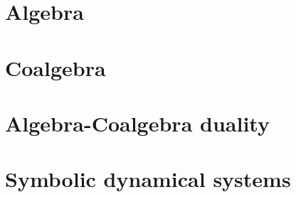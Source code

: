 

%










	\begin{frame}
		\titlepage
	\end{frame}
	
	\section{Algebra}
	
	
	\section{Coalgebra}
	
	
	\section{Algebra-Coalgebra duality}
	
	
	\section{Symbolic dynamical systems}
	

